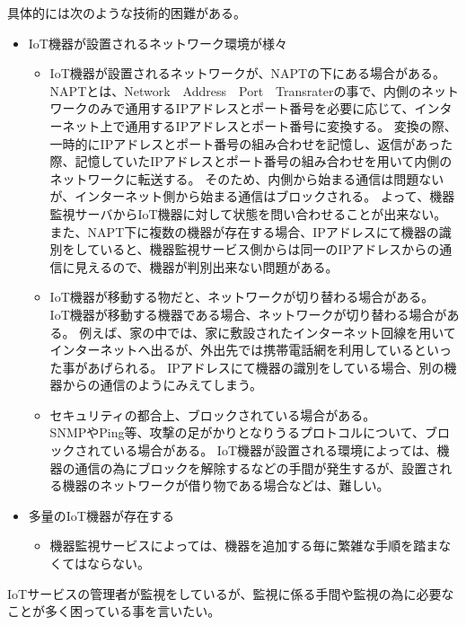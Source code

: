 具体的には次のような技術的困難がある。
\begin{itemize}
\item IoT機器が設置されるネットワーク環境が様々\\
	\begin{itemize}
		\item IoT機器が設置されるネットワークが、NAPTの下にある場合がある。\\
			NAPTとは、Network　Address　Port　Transraterの事で、内側のネットワークのみで通用するIPアドレスとポート番号を必要に応じて、インターネット上で通用するIPアドレスとポート番号に変換する。
			変換の際、一時的にIPアドレスとポート番号の組み合わせを記憶し、返信があった際、記憶していたIPアドレスとポート番号の組み合わせを用いて内側のネットワークに転送する。
			そのため、内側から始まる通信は問題ないが、インターネット側から始まる通信はブロックされる。
			よって、機器監視サーバからIoT機器に対して状態を問い合わせることが出来ない。
			また、NAPT下に複数の機器が存在する場合、IPアドレスにて機器の識別をしていると、機器監視サービス側からは同一のIPアドレスからの通信に見えるので、機器が判別出来ない問題がある。
		\item IoT機器が移動する物だと、ネットワークが切り替わる場合がある。\\
			IoT機器が移動する機器である場合、ネットワークが切り替わる場合がある。
			例えば、家の中では、家に敷設されたインターネット回線を用いてインターネットへ出るが、外出先では携帯電話網を利用しているといった事があげられる。
			IPアドレスにて機器の識別をしている場合、別の機器からの通信のようにみえてしまう。
		\item セキュリティの都合上、ブロックされている場合がある。\\
			SNMPやPing等、攻撃の足がかりとなりうるプロトコルについて、ブロックされている場合がある。
			IoT機器が設置される環境によっては、機器の通信の為にブロックを解除するなどの手間が発生するが、設置される機器のネットワークが借り物である場合などは、難しい。
	\end{itemize}
\item 多量のIoT機器が存在する
	\begin{itemize}
		\item 機器監視サービスによっては、機器を追加する毎に繁雑な手順を踏まなくてはならない。
	\end{itemize}
\end{itemize}
IoTサービスの管理者が監視をしているが、監視に係る手間や監視の為に必要なことが多く困っている事を言いたい。





